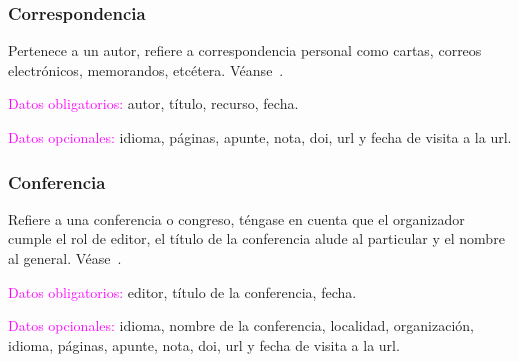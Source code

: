 \documentclass{book}
\begin{document}
{{{{{{{{{{{{{{{{{%
\begin{mdframed}[linewidth=.5pt,linecolor=black!30,roundcorner=3pt,backgroundcolor=yellow!15]
\noindent\vspace{-12pt}
\printbibliography[keyword=incollection,heading=none]
\end{mdframed}

\subsubsection{Correspondencia}

Pertenece a un autor, refiere a correspondencia personal como cartas, correos electrónicos, memorandos, etcétera. Véanse~\textcite{correspoN,correspoMARX}.

\begin{compactdesc}
\item [\textcolor{magenta}{Datos obligatorios:}] autor, título, recurso, fecha.
\item [\textcolor{magenta}{Datos opcionales:}] idioma, páginas, apunte, nota, doi, url y fecha de visita a la url.
\end{compactdesc}

\begin{mdframed}[linewidth=.5pt,linecolor=black!30,roundcorner=3pt,backgroundcolor=yellow!15]
\noindent\vspace{-12pt}
\printbibliography[keyword=correspondencia,heading=none]
\end{mdframed}

\subsubsection{Conferencia}

Refiere a una conferencia o congreso, téngase en cuenta que el organizador cumple el rol de editor, el título de la conferencia alude al particular y el nombre al general. Véase~\textcite{Conference2019}.

\begin{compactdesc}
\item [\textcolor{magenta}{Datos obligatorios:}] editor, título de la conferencia, fecha.
\item [\textcolor{magenta}{Datos opcionales:}] idioma, nombre de la conferencia, localidad, organización, idioma, páginas, apunte, nota, doi, url y fecha de visita a la url.
\end{compactdesc}

\begin{mdframed}[linewidth=.5pt,linecolor=black!30,roundcorner=3pt,backgroundcolor=yellow!15]
\noindent\vspace{-12pt}
\printbibliography[keyword=conference,heading=none]
\end{mdframed}

}}}}}}}}}}}}}}}}}
\end{document}
